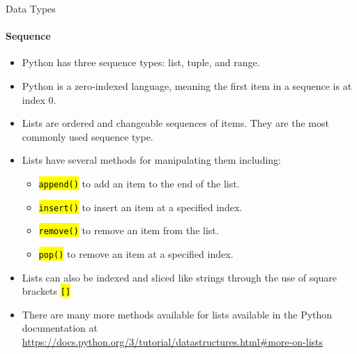 \documentclass[
    aspectratio=169, 
    usepdftitle=false, 
    xcolor={dvipsnames},
    hyperref={
        colorlinks,
        linkcolor=black,
        urlcolor=blue}
    ]{beamer}
\let\OldTexttt\texttt
\renewcommand{\texttt}[1]{\OldTexttt{\hl{#1}}}%
\begin{document}
\begin{frame}[fragile]{Data Types}
    \framesubtitle{Sequence}
    \begin{itemize}
        \item Python has three sequence types: list, tuple, and range.
        \item Python is a zero-indexed language, meaning the first item in a sequence is at index 0.
        \item Lists are ordered and changeable sequences of items. They are the most commonly used sequence type.
        \item Lists have several methods for manipulating them including:
              \begin{itemize}
                  \item \texttt{append()} to add an item to the end of the list.
                  \item \texttt{insert()} to insert an item at a specified index.
                  \item \texttt{remove()} to remove an item from the list.
                  \item \texttt{pop()} to remove an item at a specified index.
              \end{itemize}
        \item Lists can also be indexed and sliced like strings through the use of square brackets \texttt{[]}
        \item There are many more methods available for lists available in the Python documentation at \url{https://docs.python.org/3/tutorial/datastructures.html#more-on-lists}
    \end{itemize}
\end{frame}
\end{document}
